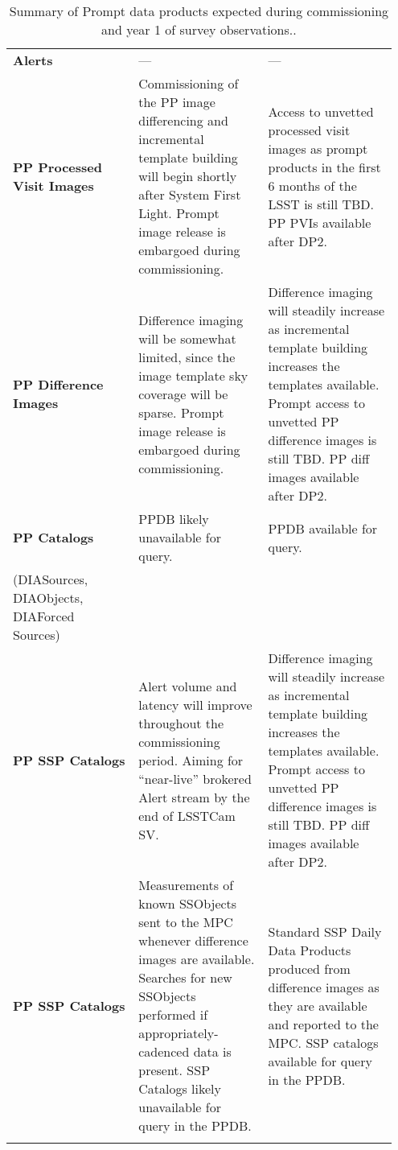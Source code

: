 \begin{table}
{\begin{tabular}{|p{0.31\linewidth} | p{0.32\linewidth}  | p{0.32\linewidth}|}
\textbf{Alerts}     & --- &   --- \\  \arrayrulecolor{gray}\hline
\textbf{PP Processed Visit Images}     & Commissioning of the PP image differencing and incremental template building will begin shortly after System First Light. Prompt image release is embargoed during commissioning.  &   Access to unvetted processed visit images as prompt products in the first 6 months of the LSST is still TBD. PP PVIs available after DP2.     \\  \arrayrulecolor{gray}\hline
\textbf{PP Difference Images}     & Difference imaging will be somewhat limited, since the image template sky coverage will be sparse. Prompt image release is embargoed during commissioning.  &     Difference imaging will steadily increase as incremental template building increases the templates available. Prompt access to unvetted PP difference images is still TBD. PP diff images available after DP2.    \\\hline
\textbf{PP Catalogs}    &   PPDB likely unavailable for query. &  PPDB available for query. \\ 
 (DIASources, DIAObjects, DIAForced Sources)  & & \\\hline
\textbf{PP SSP Catalogs}   &   Alert volume and latency will improve throughout the commissioning period. Aiming for ``near-live'' brokered Alert stream by the end of LSSTCam SV.  &   Difference imaging will steadily increase as incremental template building increases the templates available. Prompt access to unvetted PP difference images is still TBD. PP diff images available after DP2. \\  \hline
\textbf{PP SSP Catalogs}   &   Measurements of known SSObjects sent to the MPC whenever difference images are available. Searches for new SSObjects performed if appropriately-cadenced data is present. SSP Catalogs likely unavailable for query in the PPDB. &   Standard SSP Daily Data Products produced from difference images as they are available and reported to the MPC. SSP catalogs available for query in the PPDB.  \\  \hline

\arrayrulecolor{black}\hline
\end{tabular}}
\caption{Summary of Prompt data products expected during commissioning and year 1 of survey observations..}
\label{tab:prompt-data-products}
\end{table}
